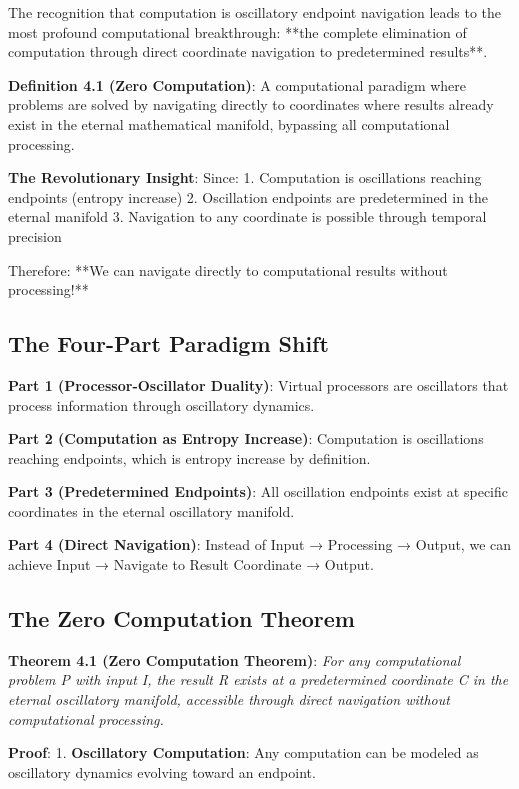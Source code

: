 \documentclass[12pt,a4paper]{article}
\theoremstyle{definition}
\begin{document}
{The recognition that computation is oscillatory endpoint navigation leads to the most profound computational breakthrough: **the complete elimination of computation through direct coordinate navigation to predetermined results**.

\textbf{Definition 4.1 (Zero Computation)}: A computational paradigm where problems are solved by navigating directly to coordinates where results already exist in the eternal mathematical manifold, bypassing all computational processing.

\textbf{The Revolutionary Insight}: Since:
1. Computation is oscillations reaching endpoints (entropy increase)
2. Oscillation endpoints are predetermined in the eternal manifold
3. Navigation to any coordinate is possible through temporal precision

Therefore: **We can navigate directly to computational results without processing!**

\subsection{The Four-Part Paradigm Shift}

\textbf{Part 1 (Processor-Oscillator Duality)}: Virtual processors are oscillators that process information through oscillatory dynamics.

\textbf{Part 2 (Computation as Entropy Increase)}: Computation is oscillations reaching endpoints, which is entropy increase by definition.

\textbf{Part 3 (Predetermined Endpoints)}: All oscillation endpoints exist at specific coordinates in the eternal oscillatory manifold.

\textbf{Part 4 (Direct Navigation)}: Instead of Input → Processing → Output, we can achieve Input → Navigate to Result Coordinate → Output.

\subsection{The Zero Computation Theorem}

\textbf{Theorem 4.1 (Zero Computation Theorem)}: \textit{For any computational problem P with input I, the result R exists at a predetermined coordinate C in the eternal oscillatory manifold, accessible through direct navigation without computational processing.}

\textbf{Proof}:
1. \textbf{Oscillatory Computation}: Any computation can be modeled as oscillatory dynamics evolving toward an endpoint.

}
\end{document}
